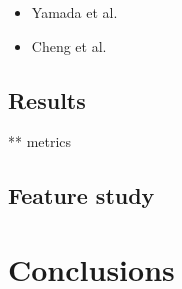 \documentclass[11pt]{article}
\begin{document}
	\begin{itemize} 
		\item  Yamada et al. \cite{Yamada2016}
		\item Cheng et al. \cite{Cheng2013}
	\end{itemize}
	
	\subsection{Results}
	** metrics
	\subsection{Feature study}
	
	\section{Conclusions}
	
	
	
	
	
\end{document}
